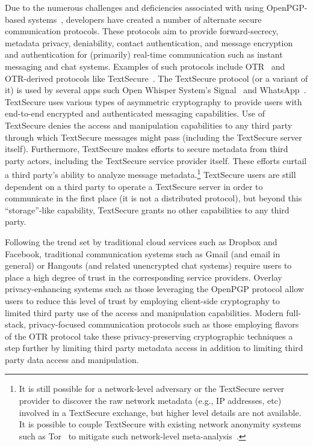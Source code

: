 Due to the numerous challenges and deficiencies associated with using
OpenPGP-based systems~\cite{borisov2004, green-pgp, whitten1999},
developers have created a number of alternate secure communication
protocols. These protocols aim to provide forward-secrecy, metadata
privacy, deniability, contact authentication, and message encryption
and authentication for (primarily) real-time communication such as
instant messaging and chat systems. Examples of such protocols include
OTR~\cite{otr-v3} and OTR-derived protocols like
TextSecure~\cite{otr-advanced-ratchet}. The TextSecure protocol (or a
variant of it) is used by several apps such Open Whisper System's
Signal~\cite{openwhisper} and WhatsApp~\cite{whatsapp}. TextSecure
uses various types of asymmetric cryptography to provide users with
end-to-end encrypted and authenticated messaging capabilities. Use of
TextSecure denies the access and manipulation capabilities to any
third party through which TextSecure messages might pass (including
the TextSecure server itself). Furthermore, TextSecure makes efforts
to secure metadata from third party actors, including the TextSecure
service provider itself. These efforts curtail a third party's ability
to analyze message metadata.\footnote{It is still possible for a
  network-level adversary or the TextSecure server provider to
  discover the raw network metadata (e.g., IP addresses, etc) involved
  in a TextSecure exchange, but higher level details are not
  available. It is possible to couple TextSecure with existing network
  anonymity systems such as Tor~\cite{dingledine2004} to mitigate such
  network-level meta-analysis~\cite{intercept-chatting}.} TextSecure
users are still dependent on a third party to operate a TextSecure
server in order to communicate in the first place (it is not a
distributed protocol), but beyond this ``storage''-like capability,
TextSecure grants no other capabilities to any third party.

Following the trend set by traditional cloud services such as Dropbox
and Facebook, traditional communication systems such as Gmail (and
email in general) or Hangouts (and related unencrypted chat systems)
require users to place a high degree of trust in the corresponding
service providers. Overlay privacy-enhancing systems such as those
leveraging the OpenPGP protocol allow users to reduce this level of
trust by employing client-side cryptography to limited third party use
of the access and manipulation capabilities. Modern full-stack,
privacy-focused communication protocols such as those employing
flavors of the OTR protocol take these privacy-preserving
cryptographic techniques a step further by limiting third party
metadata access in addition to limiting third party data access and
manipulation.

